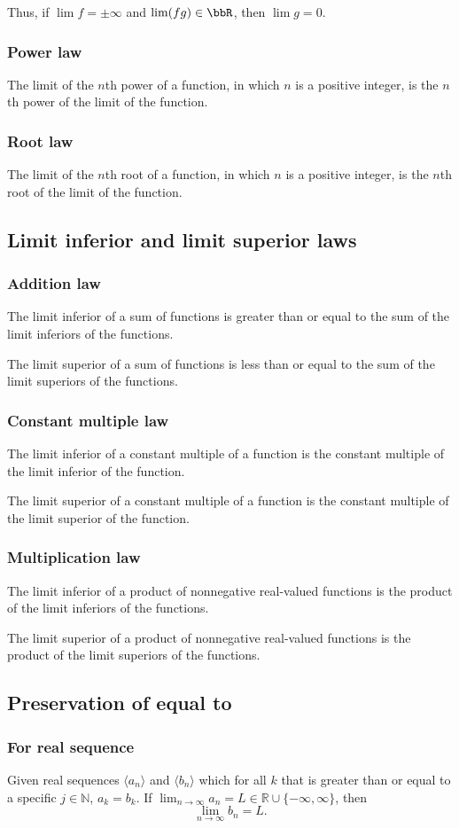 \documentclass[a4paper,12pt]{report}
\begin{document}
\begin{itemize}
\begin{itemize}
Thus, if $\lim f=\pm\infty$ and $\lim(fg)\in\bbR$, then $\lim g=0$.
\subsubsection{Power law}
The limit of the $n$th power of a function, in which $n$ is a positive integer, is the $n$th power of the limit of the function.
\subsubsection{Root law}
The limit of the $n$th root of a function, in which $n$ is a positive integer, is the $n$th root of the limit of the function.
\subsection{Limit inferior and limit superior laws}
\subsubsection{Addition law}
The limit inferior of a sum of functions is greater than or equal to the sum of the limit inferiors of the functions.

The limit superior of a sum of functions is less than or equal to the sum of the limit superiors of the functions.
\subsubsection{Constant multiple law}
The limit inferior of a constant multiple of a function is the constant multiple of the limit inferior of the function.

The limit superior of a constant multiple of a function is the constant multiple of the limit superior of the function.
\subsubsection{Multiplication law}
The limit inferior of a product of nonnegative real-valued functions is the product of the limit inferiors of the functions.

The limit superior of a product of nonnegative real-valued functions is the product of the limit superiors of the functions.
\subsection{Preservation of equal to}
\subsubsection{For real sequence}
Given real sequences $\langle a_n\rangle$ and $\langle b_n\rangle$ which for all $k$ that is greater than or equal to a specific $j\in \mathbb{N}$, $a_k=b_k$. If $\lim_{n\to\infty}a_n=L\in\mathbb{R}\cup\{-\infty,\infty\}$, then
\[\lim_{n\to\infty}b_n=L.\]

\end{itemize}
\end{itemize}
\end{document}
